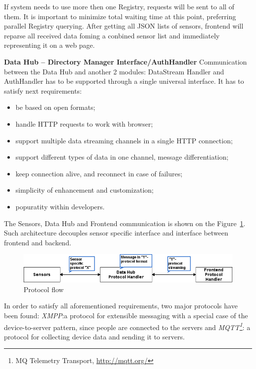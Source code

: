       If system needs to use more then one Registry, requests will be sent to all of them. It is important to minimize total waiting time at this point, preferring parallel Registry querying. After getting all JSON lists of sensors, frontend will reparse all received data foming a conbined sensor list and immediately representing it on a web page.

      \textbf{Data Hub -- Directory Manager Interface/AuthHandler}
      \newline
      Communication between the Data Hub and another 2 modules: DataStream Handler and AuthHandler has to be supported through a single universal interface. It has to satisfy next requirements:
      \begin{itemize}
      \item be based on open formats;
      \item handle HTTP requests to work with browser;
      \item support multiple data streaming channels in a single HTTP connection;
      \item support different types of data in one channel, message differentiation;
      \item keep connection alive, and reconnect in case of failures;
      \item simplicity of enhancement and customization;
      \item popuratity within developers.
      \end{itemize}

      The Sensors, Data Hub and Frontend communication is shown on the Figure~\ref{img:protocol}. Such architecture decouples sensor specific interface and interface between frontend and backend.

      \begin{figure}[!ht]
      \centering
      \includegraphics[scale=0.6]{images/Protocol_flow.png}   
      \caption[Protocol flow]{Protocol flow}
      \label{img:protocol}                           
      \end{figure}

      In order to satisfy all aforementioned requirements, two major protocols have been found: \emph{XMPP}\cite{XMPPbook}:a protocol for extensible messaging with a special case of the device-to-server pattern, since people are connected to the servers and \emph{MQTT\footnote{MQ Telemetry Transport, \url{http://mqtt.org/}}}: a protocol for collecting device data and sending it to servers. 

